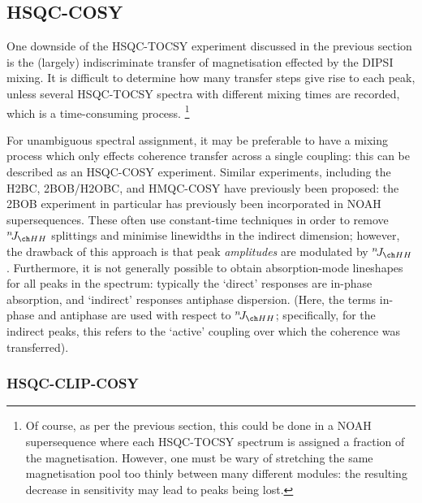 \subsection{HSQC-COSY}
\label{subsec:noah__hsqccosy}

One downside of the HSQC-TOCSY experiment discussed in the previous section is the (largely) indiscriminate transfer of magnetisation effected by the DIPSI mixing.
It is difficult to determine how many transfer steps give rise to each peak, unless several HSQC-TOCSY spectra with different mixing times are recorded, which is a time-consuming process.%
\footnote{Of course, as per the previous section, this could be done in a NOAH supersequence where each HSQC-TOCSY spectrum is assigned a fraction of the  magnetisation. However, one must be wary of stretching the same magnetisation pool too thinly between many different modules: the resulting decrease in sensitivity may lead to peaks being lost.}

For unambiguous spectral assignment, it may be preferable to have a mixing process which only effects coherence transfer across a single coupling: this can be described as an HSQC-COSY experiment.
Similar experiments, including the H2BC\autocite{Nyberg2005JACS,Nyberg2005MRC}, 2BOB/H2OBC\autocite{Kupce2017MRC}, and HMQC-COSY\autocite{Hu2011JBNMR} have previously been proposed: the 2BOB experiment in particular has previously been incorporated in NOAH supersequences\autocite{Kupce2019JMR}.
These often use constant-time techniques in order to remove $\nJ{HH}$ splittings and minimise linewidths in the indirect dimension; however, the drawback of this approach is that peak \textit{amplitudes} are modulated by $\nJ{HH}$.
Furthermore, it is not generally possible to obtain absorption-mode lineshapes for all peaks in the spectrum: typically the `direct' responses are in-phase absorption, and `indirect' responses antiphase dispersion.
(Here, the terms in-phase and antiphase are used with respect to $\nJ{HH}$; specifically, for the indirect peaks, this refers to the `active' coupling over which the coherence was transferred).


\subsubsection{HSQC-CLIP-COSY}

